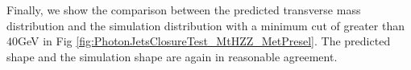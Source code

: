 Finally, we show the comparison between the predicted transverse mass distribution and the simulation
distribution %
with a minimum \met cut of greater than $40$GeV in Fig \ref{fig:PhotonJetsClosureTest_MtHZZ_MetPresel}. 
The predicted shape and the simulation shape are again in reasonable agreement. 


